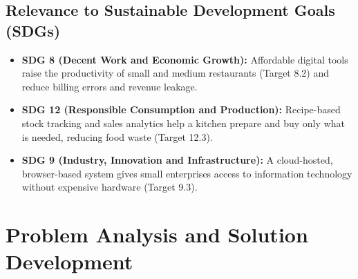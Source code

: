\documentclass[11pt,a4paper]{report}
\begin{document}
\begin{center}
\end{center}

\subsection{Relevance to Sustainable Development Goals (SDGs)}
\begin{itemize}
    \item \textbf{SDG 8 (Decent Work and Economic Growth):} Affordable digital tools raise the productivity of small and medium restaurants (Target 8.2) and reduce billing errors and revenue leakage.
    \item \textbf{SDG 12 (Responsible Consumption and Production):} Recipe-based stock tracking and sales analytics help a kitchen prepare and buy only what is needed, reducing food waste (Target 12.3).
    \item \textbf{SDG 9 (Industry, Innovation and Infrastructure):} A cloud-hosted, browser-based system gives small enterprises access to information technology without expensive hardware (Target 9.3).
\end{itemize}


\section{Problem Analysis and Solution Development}
\end{document}
